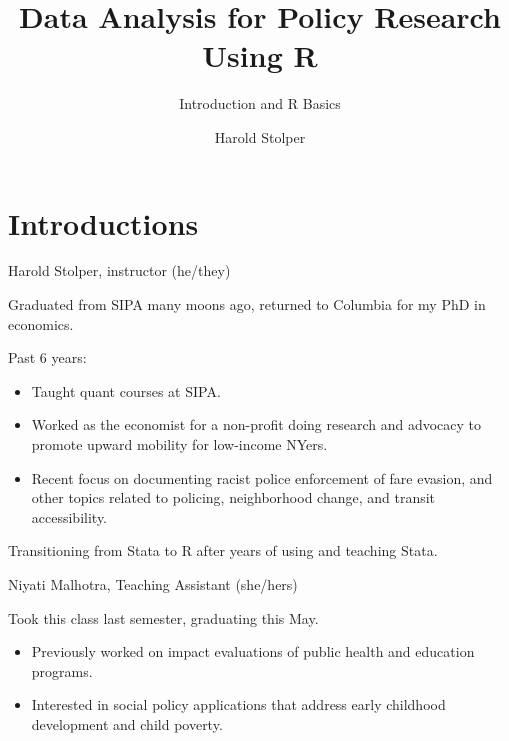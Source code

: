 \documentclass[
  8pt,
  ignorenonframetext,
  dvipsnames]{beamer}
\title{Data Analysis for Policy Research Using R}
\subtitle{Introduction and R Basics}
\author{Harold Stolper}
\date{}
\providecommand{\tightlist}{%
  \setlength{\itemsep}{0pt}\setlength{\parskip}{0pt}}
\let\olditem\item
\renewcommand{\item}{%
  \olditem\vspace{4pt}
}
\begin{document}
\frame{\titlepage}

\begin{frame}
  \tableofcontents[hideallsubsections]
\end{frame}
\hypertarget{introductions}{%
\section{Introductions}\label{introductions}}

\begin{frame}{Harold Stolper, instructor (he/they)}
\protect\hypertarget{harold-stolper-instructor-hethey}{}

Graduated from SIPA many moons ago, returned to Columbia for my PhD in
economics.

\medskip

Past 6 years:

\begin{itemize}
\tightlist
\item
  Taught quant courses at SIPA.
\item
  Worked as the economist for a non-profit doing research and advocacy
  to promote upward mobility for low-income NYers.
\item
  Recent focus on documenting racist police enforcement of fare evasion,
  and other topics related to policing, neighborhood change, and transit
  accessibility.
\end{itemize}

\medskip

Transitioning from Stata to R after years of using and teaching Stata.

\end{frame}

\begin{frame}{Niyati Malhotra, Teaching Assistant (she/hers)}
\protect\hypertarget{niyati-malhotra-teaching-assistant-shehers}{}

Took this class last semester, graduating this May.

\medskip

\begin{itemize}
\tightlist
\item
  Previously worked on impact evaluations of public health and education
  programs.
\item
  Interested in social policy applications that address early childhood
  development and child poverty.
\end{itemize}

\end{frame}
\end{document}
